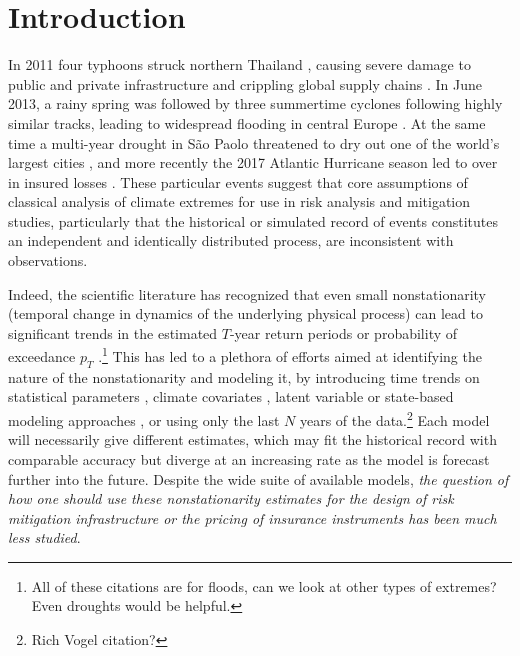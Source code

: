 \documentclass[12pt]{article}
\begin{document}
\section{Introduction}

In 2011 four typhoons struck northern Thailand \citep{Gale2013}, causing severe damage to public and private infrastructure and crippling global supply chains \citep{Haraguchi2015}.
In June 2013, a rainy spring was followed by three summertime cyclones following highly similar tracks, leading to widespread flooding in central Europe \citep{Grams2014}.
At the same time a multi-year drought in S\~ao Paolo threatened to dry out one of the world's largest cities \citep{Seth2015}, and more recently the 2017 Atlantic Hurricane season led to over  in insured losses \citep{SwissRe2017}.
These particular events suggest that core assumptions of classical analysis of climate extremes for use in risk analysis and mitigation studies, particularly that the historical or simulated record of events constitutes an independent and identically distributed process, are inconsistent with observations.

Indeed, the scientific literature has recognized that even small nonstationarity (temporal change in dynamics of the underlying physical process) can lead to significant trends in the estimated $T$-year return periods or probability of exceedance $p_T$ \citep{Milly2008,Vogel2011,Salas2014,Merz2014,Obeysekera2016}.\footnote{All of these citations are for floods, can we look at other types of extremes? Even droughts would be helpful.}
This has led to a plethora of efforts aimed at identifying the nature of the nonstationarity and modeling it, \eg{} by introducing time trends on statistical parameters \citep{Strupczewski2001,Vogel2011,Obeysekera2014,Serinaldi2015}, climate covariates \citep{Delgado2014,Griffis2007,Silva2016,Sun2014,Hall2014}, latent variable or state-based modeling approaches \citep{Griffis2007,Sveinsson2005,Waylen1986}, or using only the last $N$ years of the data.\footnote{Rich Vogel citation?}
Each model will necessarily give different estimates, which may fit the historical record with comparable accuracy but diverge at an increasing rate as the model is forecast further into the future.
Despite the wide suite of available models, \emph{the question of how one should use these nonstationarity estimates for the design of risk mitigation infrastructure or the pricing of insurance instruments has been much less studied}.
\end{document}
